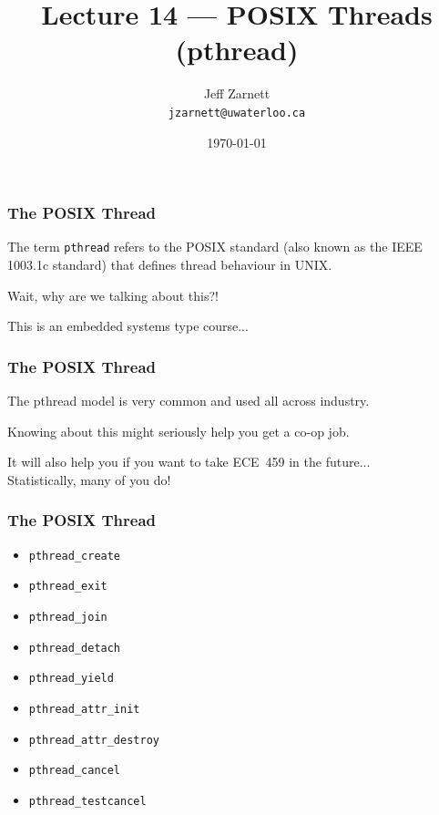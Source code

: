 

\title{Lecture 14 --- POSIX Threads (pthread) }

\author{Jeff Zarnett \\ \small \texttt{jzarnett@uwaterloo.ca}}
\date{\today}




\begin{frame}
	\titlepage

\end{frame}


\begin{frame}
	\frametitle{The POSIX Thread}

	The term \texttt{pthread} refers to the POSIX standard (also known as the IEEE 1003.1c standard) that defines thread behaviour in UNIX.

Wait, why are we talking about this?!

This is an embedded systems type course...

\end{frame}

\begin{frame}
	\frametitle{The POSIX Thread}

The pthread model is very common and used all across industry.

Knowing about this might seriously help you get a co-op job.


It will also help you if you want to take ECE~459 in the future...\\
\quad Statistically, many of you do! 

\end{frame}


\begin{frame}
	\frametitle{The POSIX Thread}
	\begin{itemize}
		\item \texttt{pthread\_create}
		\item \texttt{pthread\_exit}
		\item \texttt{pthread\_join}
		\item \texttt{pthread\_detach}
		\item \texttt{pthread\_yield}
		\item \texttt{pthread\_attr\_init}
		\item \texttt{pthread\_attr\_destroy}
		\item \texttt{pthread\_cancel}
		\item \texttt{pthread\_testcancel}
	\end{itemize}

\end{frame}


